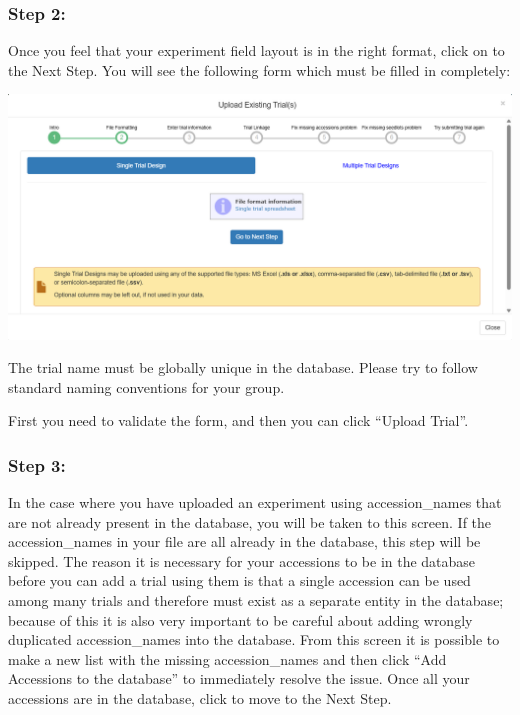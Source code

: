 \documentclass[
  12pt,
]{book}
\begin{document}
\hypertarget{step-2}{%
\subsubsection*{Step 2:}\label{step-2}}


Once you feel that your experiment field layout is in the right format, click on to the Next Step. You will see the following form which must be filled in completely:

\begin{center}\includegraphics[width=0.95\linewidth]{assets/images/manage_trials_upload_trial_2} \end{center}

The trial name must be globally unique in the database. Please try to follow standard naming conventions for your group.

First you need to validate the form, and then you can click ``Upload Trial''.

\hypertarget{step-3}{%
\subsubsection*{Step 3:}\label{step-3}}


In the case where you have uploaded an experiment using accession\_names that are not already present in the database, you will be taken to this screen. If the accession\_names in your file are all already in the database, this step will be skipped. The reason it is necessary for your accessions to be in the database before you can add a trial using them is that a single accession can be used among many trials and therefore must exist as a separate entity in the database; because of this it is also very important to be careful about adding wrongly duplicated accession\_names into the database. From this screen it is possible to make a new list with the missing accession\_names and then click ``Add Accessions to the database'' to immediately resolve the issue. Once all your accessions are in the database, click to move to the Next Step.
\end{document}
